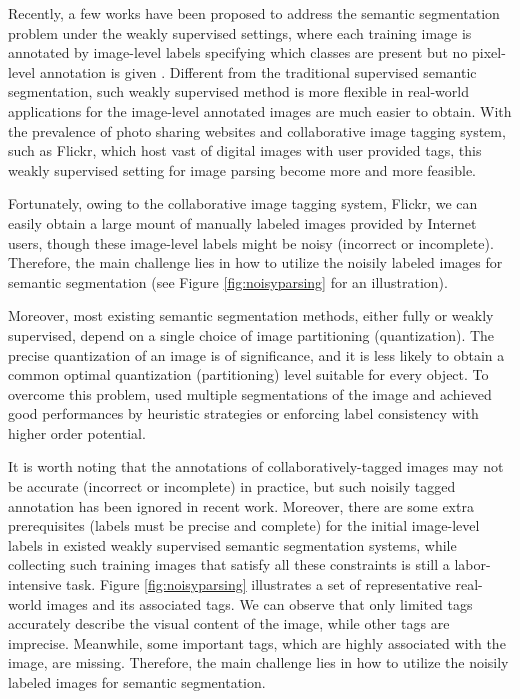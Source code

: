Recently, a few works have been proposed to address the semantic segmentation problem under the weakly supervised settings, where each training image is annotated by image-level labels specifying which classes are present but no pixel-level annotation is given \cite{verbeek2007region,vezhnevets2010towards,vezhnevets2011weakly,vezhnevets2012weakly,xu2014tell,zhang2013sparse,zhang2013probabilistic}. Different from the traditional supervised semantic segmentation, such weakly supervised method is more flexible in real-world applications for the image-level annotated images are much easier to obtain. With the prevalence of photo sharing websites and collaborative image tagging system, such as Flickr, which host vast of digital images with user provided tags, this weakly supervised setting for image parsing become more and more feasible.

 Fortunately, owing to the collaborative image tagging system, \eg Flickr, we can easily obtain a large mount of manually labeled images provided by Internet users, though these image-level labels might be noisy (incorrect or incomplete). Therefore, the main challenge lies in how to utilize the noisily labeled images for semantic segmentation (see Figure \ref{fig:noisyparsing} for an illustration).


 Moreover, most existing semantic segmentation methods, either fully or weakly supervised, depend on a single choice of image partitioning (quantization). The precise quantization of an image is of significance, and it is less likely to obtain a common optimal quantization (partitioning) level suitable for every object. To overcome this problem, \cite{hoiem2005geometric,kohli2009robust,ladicky2009associative,nowozin2010parameter,russell2006using} used multiple segmentations of the image and achieved good performances by heuristic strategies or enforcing label consistency with higher order potential.

It is worth noting that the annotations of collaboratively-tagged images may not be accurate (incorrect or incomplete) in practice, but such noisily tagged annotation has been ignored in recent work. Moreover, there are some extra prerequisites (\eg labels must be precise and complete) for the initial image-level labels in existed weakly supervised semantic segmentation systems, while collecting such training images that satisfy all these constraints is still a labor-intensive task. Figure \ref{fig:noisyparsing} illustrates a set of representative real-world images and its associated tags. We can observe that only limited tags accurately describe the visual content of the image, while other tags are imprecise. Meanwhile, some important tags, which are highly associated with the image, are missing. Therefore, the main challenge lies in how to utilize the noisily labeled images for semantic segmentation.
\fi

